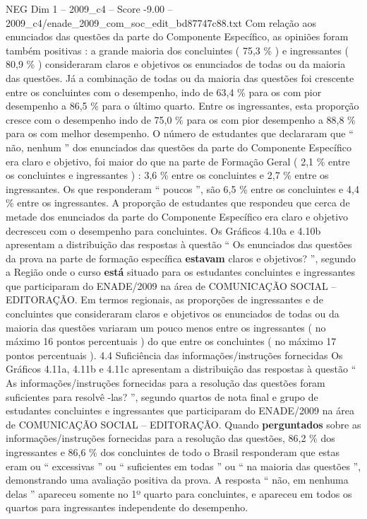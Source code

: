 \begin{textsample}{NEG Dim 1 – 2009\_c4 – Score -9.00 – 2009\_c4/enade\_2009\_com\_soc\_edit\_bd87747c88.txt}
Com relação aos enunciados das questões da parte do Componente Específico, as opiniões foram também positivas : a grande maioria dos concluintes ( 75,3 \% ) e ingressantes ( 80,9 \% ) consideraram claros e objetivos os enunciados de todas ou da maioria das questões.
Já a combinação de todas ou da maioria das questões foi crescente entre os concluintes com o desempenho, indo de 63,4 \% para os com pior desempenho a 86,5 \% para o último quarto.
Entre os ingressantes, esta proporção cresce com o desempenho indo de 75,0 \% para os com pior desempenho a 88,8 \% para os com melhor desempenho.
O número de estudantes que declararam que “ não, nenhum ” dos enunciados das questões da parte do Componente Específico era claro e objetivo, foi maior do que na parte de Formação Geral ( 2,1 \% entre os concluintes e ingressantes ) : 3,6 \% entre os concluintes e 2,7 \% entre os ingressantes.
Os que responderam “ poucos ”, são 6,5 \% entre os concluintes e 4,4 \% entre os ingressantes.
A proporção de estudantes que respondeu que cerca de metade dos enunciados da parte do Componente Específico era claro e objetivo decresceu com o desempenho para concluintes.
Os Gráficos 4.10a e 4.10b apresentam a distribuição das respostas à questão “ Os enunciados das questões da prova na parte de formação específica \textbf{estavam} claros e objetivos? ”, segundo a Região onde o curso \textbf{está} situado para os estudantes concluintes e ingressantes que participaram do ENADE/2009 na área de COMUNICAÇÃO SOCIAL – EDITORAÇÃO.
Em termos regionais, as proporções de ingressantes e de concluintes que consideraram claros e objetivos os enunciados de todas ou da maioria das questões variaram um pouco menos entre os ingressantes ( no máximo 16 pontos percentuais ) do que entre os concluintes ( no máximo 17 pontos percentuais ). 4.4 Suficiência das informações/instruções fornecidas Os Gráficos 4.11a, 4.11b e 4.11c apresentam a distribuição das respostas à questão “ As informações/instruções fornecidas para a resolução das questões foram suficientes para resolvê -las? ”, segundo quartos de nota final e grupo de estudantes concluintes e ingressantes que participaram do ENADE/2009 na área de COMUNICAÇÃO SOCIAL – EDITORAÇÃO.
Quando \textbf{perguntados} sobre as informações/instruções fornecidas para a resolução das questões, 86,2 \% dos ingressantes e 86,6 \% dos concluintes de todo o Brasil responderam que estas eram ou “ excessivas ” ou “ suficientes em todas ” ou “ na maioria das questões ”, demonstrando uma avaliação positiva da prova.
A resposta “ não, em nenhuma delas ” apareceu somente no 1º quarto para concluintes, e apareceu em todos os quartos para ingressantes independente do desempenho.

\end{textsample}
